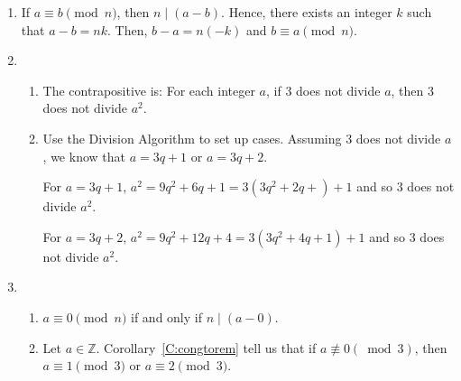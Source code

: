 \begin{enumerate}
%
%
%
%
 


\item If  $a \equiv b \pmod n$,  then  $n \mid ( a - b )$.  Hence, there exists an integer $k$ such that $a - b = nk$.  Then, $b - a = n ( -k )$ and $b \equiv a \pmod n$.

\item \begin{enumerate}
\item The contrapositive is:  For each integer $a$, if 3 does not divide $a$, then 3 does not divide $a^2$.
\item Use the Division Algorithm to set up cases.  Assuming 3 does not divide $a$, we know that $a = 3q + 1$ or $a = 3q + 2$.

For $a = 3q + 1$, $a^2 = 9q^2 + 6q + 1 = 3\left( 3q^2 + 2q + \right) + 1$ and so 3 does not divide $a^2$.

For $a = 3q + 2$, $a^2 = 9q^2 + 12q + 4 = 3\left( 3q^2 + 4q + 1 \right) + 1$ and so 3 does not divide $a^2$.

\end{enumerate}

\item
\begin{enumerate}
\item $a \equiv 0 \pmod n$ if and only if $n \mid \left( a - 0 \right)$.

\item Let  $a \in \mathbb{Z}$.  Corollary~\ref{C:congtorem} tell us that  if  $a \not \equiv 0 \left( {\bmod 3} \right)$, then  \\
$a \equiv 1 \pmod 3$ or  
$a \equiv 2 \pmod 3$.


\end{enumerate}
\end{enumerate}
